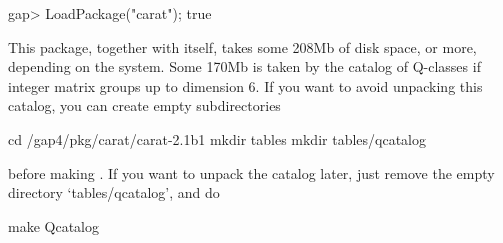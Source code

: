 \beginexample
gap> LoadPackage("carat");
true
\endexample

This package, together with {\CARAT} itself, takes some 208Mb of disk space,
or more, depending on the system. Some 170Mb is taken by the catalog
of Q-classes if integer matrix groups up to dimension 6. If you want
to avoid unpacking this catalog, you can create empty subdirectories

\begintt
cd /gap4/pkg/carat/carat-2.1b1
mkdir tables
mkdir tables/qcatalog
\endtt

before making {\CARAT}. If you want to unpack the catalog later, just
remove the empty directory `tables/qcatalog', and do

\begintt
make Qcatalog
\endtt

